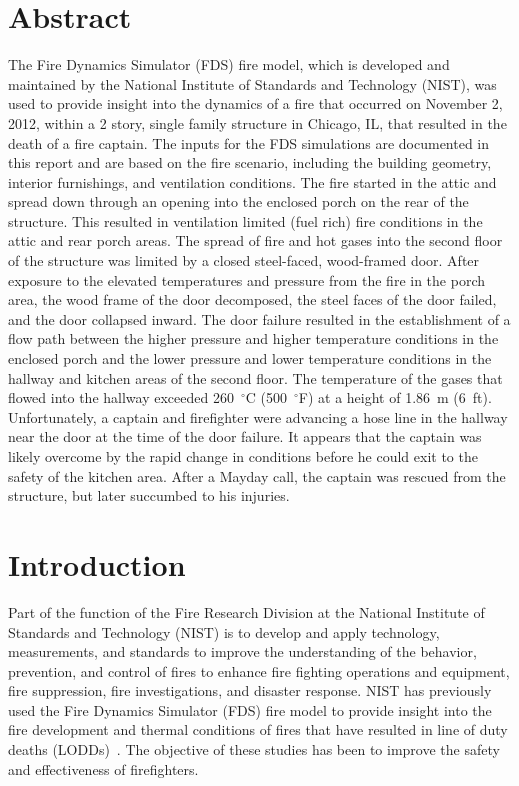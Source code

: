 \documentclass[12pt,oneside]{book}
\begin{document}
\chapter*{\centering Abstract}
The Fire Dynamics Simulator (FDS) fire model, which is developed and maintained by the National Institute of Standards and Technology (NIST), was used to provide insight into the dynamics of a fire that occurred on November 2, 2012, within a 2  story, single family structure in Chicago, IL, that resulted in the death of a fire captain. The inputs for the FDS simulations are documented in this report and are based on the fire scenario, including the building geometry, interior furnishings, and ventilation conditions. The fire started in the attic and spread down through an opening into the enclosed porch on the rear of the structure. This resulted in ventilation limited (fuel rich) fire conditions in the attic and rear porch areas. The spread of fire and hot gases into the second floor of the structure was limited by a closed steel-faced, wood-framed door. After exposure to the elevated temperatures and pressure from the fire in the porch area, the wood frame of the door decomposed, the steel faces of the door failed, and the door collapsed inward. The door failure resulted in the establishment of a flow path between the higher pressure and higher temperature conditions in the enclosed porch and the lower pressure and lower temperature conditions in the hallway and kitchen areas of the second floor. The temperature of the gases that flowed into the hallway exceeded 260~$^{\circ}$C (500~$^{\circ}$F) at a height of 1.86~m (6~ft). Unfortunately, a captain and firefighter were advancing a hose line in the hallway near the door at the time of the door failure. It appears that the captain was likely overcome by the rapid change in conditions before he could exit to the safety of the kitchen area. After a Mayday call, the captain was rescued from the structure, but later succumbed to his injuries.

\chapter{Introduction}
Part of the function of the Fire Research Division at the National Institute of Standards and Technology (NIST) is to develop and apply technology, measurements, and standards to improve the understanding of the behavior, prevention, and control of fires to enhance fire fighting operations and equipment, fire suppression, fire investigations, and disaster response. NIST has previously used the Fire Dynamics Simulator (FDS) fire model to provide insight into the fire development and thermal conditions of fires that have resulted in line of duty deaths (LODDs)~\cite{Madrzykowski:1,Iowa,Texas,Bryner:Charleston,barowy:texas}. The objective of these studies has been to improve the safety and effectiveness of firefighters.
\end{document}
